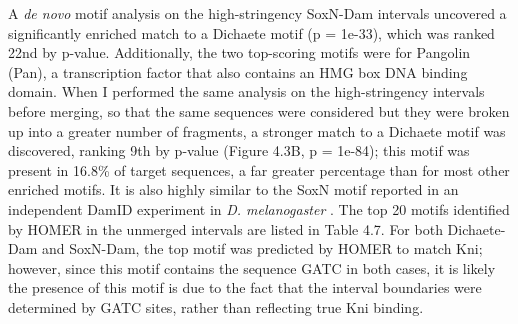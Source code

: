 A \emph{de novo} motif analysis on the high-stringency SoxN-Dam intervals uncovered a significantly enriched match to a Dichaete motif (p = 1e-33), which was ranked 22nd by p-value. Additionally, the two top-scoring motifs were for Pangolin (Pan), a transcription factor that also contains an HMG box DNA binding domain. When I performed the same analysis on the high-stringency intervals before merging, so that the same sequences were considered but they were broken up into a greater number of fragments, a stronger match to a Dichaete motif was discovered, ranking 9th by p-value (Figure 4.3B, p = 1e-84); this motif was present in 16.8\% of target sequences, a far greater percentage than for most other enriched motifs. It is also highly similar to the SoxN motif reported in an independent DamID experiment in \emph{D. melanogaster} \citep{ferrero_soxneuro_2014}. The top 20 motifs identified by HOMER in the unmerged intervals are listed in Table 4.7. For both Dichaete-Dam and SoxN-Dam, the top motif was predicted by HOMER to match Kni; however, since this motif contains the sequence GATC in both cases, it is likely the presence of this motif is due to the fact that the interval boundaries were determined by GATC sites, rather than reflecting true Kni binding.


